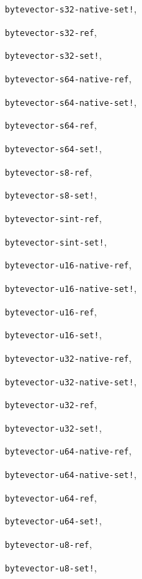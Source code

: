 {\begin{multicols}{2}
\texttt{bytevector-s32-native-set!}, \textit{\pageref{objects_s255}}
  
\texttt{bytevector-s32-ref}, \textit{\pageref{objects_s256}}
  
\texttt{bytevector-s32-set!}, \textit{\pageref{objects_s257}}
  
\texttt{bytevector-s64-native-ref}, \textit{\pageref{objects_s254}}
  
\texttt{bytevector-s64-native-set!}, \textit{\pageref{objects_s255}}
  
\texttt{bytevector-s64-ref}, \textit{\pageref{objects_s256}}
  
\texttt{bytevector-s64-set!}, \textit{\pageref{objects_s257}}
  
\texttt{bytevector-s8-ref}, \textit{\pageref{objects_s249}}
  
\texttt{bytevector-s8-set!}, \textit{\pageref{objects_s251}}
  
\texttt{bytevector-sint-ref}, \textit{\pageref{objects_s258}}
  
\texttt{bytevector-sint-set!}, \textit{\pageref{objects_s259}}
  
\texttt{bytevector-u16-native-ref}, \textit{\pageref{objects_s254}}
  
\texttt{bytevector-u16-native-set!}, \textit{\pageref{objects_s255}}
  
\texttt{bytevector-u16-ref}, \textit{\pageref{objects_s256}}
  
\texttt{bytevector-u16-set!}, \textit{\pageref{objects_s257}}
  
\texttt{bytevector-u32-native-ref}, \textit{\pageref{objects_s254}}
  
\texttt{bytevector-u32-native-set!}, \textit{\pageref{objects_s255}}
  
\texttt{bytevector-u32-ref}, \textit{\pageref{objects_s256}}
  
\texttt{bytevector-u32-set!}, \textit{\pageref{objects_s257}}
  
\texttt{bytevector-u64-native-ref}, \textit{\pageref{objects_s254}}
  
\texttt{bytevector-u64-native-set!}, \textit{\pageref{objects_s255}}
  
\texttt{bytevector-u64-ref}, \textit{\pageref{objects_s256}}
  
\texttt{bytevector-u64-set!}, \textit{\pageref{objects_s257}}
  
\texttt{bytevector-u8-ref}, \textit{\pageref{objects_s248}}
  
\texttt{bytevector-u8-set!}, \textit{\pageref{objects_s250}}
  

\end{multicols}}
